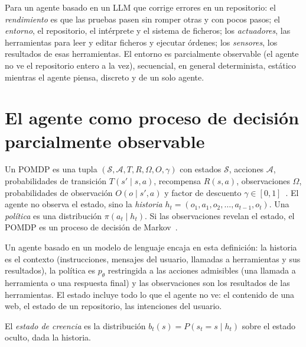 \begin{ejemplo}\label{ej:peas}
Para un agente basado en un LLM que corrige errores en un repositorio: el \emph{rendimiento} es que las pruebas pasen sin romper otras y con pocos pasos; el \emph{entorno}, el repositorio, el intérprete y el sistema de ficheros; los \emph{actuadores}, las herramientas para leer y editar ficheros y ejecutar órdenes; los \emph{sensores}, los resultados de esas herramientas. El entorno es parcialmente observable (el agente no ve el repositorio entero a la vez), secuencial, en general determinista, estático mientras el agente piensa, discreto y de un solo agente.
\end{ejemplo}

\section{El agente como proceso de decisión parcialmente observable}

\begin{definicion}\label{def:pomdp}
Un POMDP es una tupla $(\mathcal{S},\mathcal{A},T,R,\Omega,O,\gamma)$ con estados $\mathcal{S}$, acciones $\mathcal{A}$, probabilidades de transición $T(s'\mid s,a)$, recompensa $R(s,a)$, observaciones $\Omega$, probabilidades de observación $O(o\mid s',a)$ y factor de descuento $\gamma\in[0,1]$~\cite{kaelbling}. El agente no observa el estado, sino la \emph{historia} $h_t=(o_1,a_1,o_2,\dots,a_{t-1},o_t)$. Una \emph{política} es una distribución $\pi(a_t\mid h_t)$. Si las observaciones revelan el estado, el POMDP es un proceso de decisión de Markov~\cite[cap.~3]{sb}.
\end{definicion}

Un agente basado en un modelo de lenguaje encaja en esta definición: la historia es el contexto (instrucciones, mensajes del usuario, llamadas a herramientas y sus resultados), la política es $p_\theta$ restringida a las acciones admisibles (una llamada a herramienta o una respuesta final) y las observaciones son los resultados de las herramientas. El estado incluye todo lo que el agente no ve: el contenido de una web, el estado de un repositorio, las intenciones del usuario.

\begin{definicion}\label{def:creencia}
El \emph{estado de creencia} es la distribución $b_t(s)=P(s_t=s\mid h_t)$ sobre el estado oculto, dada la historia.
\end{definicion}

